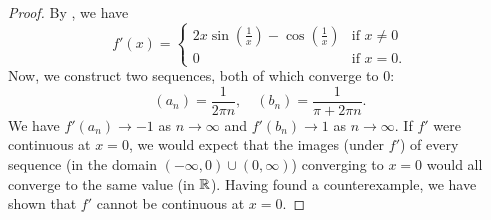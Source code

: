 \begin{problem}
\begin{proof}
    By , we have
    \begin{equation*}
      f'(x) = 
      \begin{cases}
        2x \sin\left(\frac{1}{x}\right) - \cos\left(\frac{1}{x}\right) & \text{if } x \neq 0 \\
        0 & \text{if } x = 0.
      \end{cases}
    \end{equation*}
    Now, we construct two sequences, both of which converge to $0$:
    \[
      (a_{n}) = \frac{1}{2 \pi n}, \quad (b_{n}) = \frac{1}{\pi + 2 \pi n}.
    \]
    We have $f'(a_{n}) \to -1$ as $n \to \infty$ and $f'(b_{n}) \to 1$ as $n \to \infty$. 
    If $f'$ were continuous at $x = 0$, we would expect that the images (under $f'$) of every sequence
    (in the domain $(-\infty, 0) \cup (0, \infty)$) converging to $x =0$ would all converge to the same value (in $\mathbb{R}$).
    Having found a counterexample, we have shown that $f'$ cannot be continuous at $x = 0$.
  \end{proof}
\end{problem}

